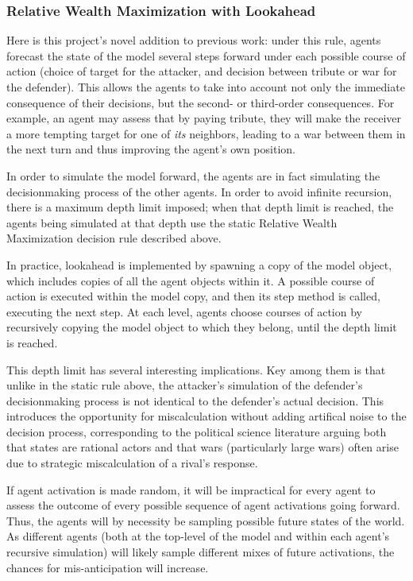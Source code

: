 \documentclass{article}
\begin{document}
\subsubsection{Relative Wealth Maximization with Lookahead}

Here is this project's novel addition to previous work: under this rule, agents forecast the state of the model several steps forward under each possible course of action (choice of target for the attacker, and decision between tribute or war for the defender). This allows the agents to take into account not only the immediate consequence of their decisions, but the second- or third-order consequences. For example, an agent may assess that by paying tribute, they will make the receiver a more tempting target for one of \emph{its} neighbors, leading to a war between them in the next turn and thus improving the agent's own position.

In order to simulate the model forward, the agents are in fact simulating the decisionmaking process of the other agents. In order to avoid infinite recursion, there is a maximum depth limit imposed; when that depth limit is reached, the agents being simulated at that depth use the static Relative Wealth Maximization decision rule described above.

In practice, lookahead is implemented by spawning a copy of the model object, which includes copies of all the agent objects within it. A possible course of action is executed within the model copy, and then its step method is called, executing the next step. At each level, agents choose courses of action by recursively copying the model object to which they belong, until the depth limit is reached. 

This depth limit has several interesting implications. Key among them is that unlike in the static rule above, the attacker's simulation of the defender's decisionmaking process is not identical to the defender's actual decision. This introduces the opportunity for miscalculation without adding artifical noise to the decision process, corresponding to the political science literature arguing both that states are rational actors and that wars (particularly large wars) often arise due to strategic miscalculation of a rival's response. 

If agent activation is made random, it will be impractical for every agent to assess the outcome of every possible sequence of agent activations going forward. Thus, the agents will by necessity be sampling possible future states of the world. As different agents (both at the top-level of the model and within each agent's recursive simulation) will likely sample different mixes of future activations, the chances for mis-anticipation will increase.
\end{document}
